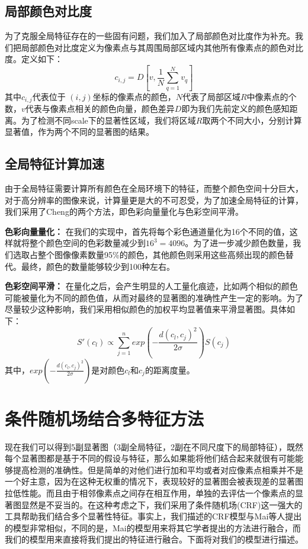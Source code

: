 \subsection{局部颜色对比度}
为了克服全局特征存在的一些固有问题，我们加入了局部颜色对比度作为补充。我们把局部颜色对比度定义为像素点与其周围局部区域内其他所有像素点的颜色对比度。定义如下：
\begin{equation}
  c_{i,j} = D\left [v, \frac{1}{N} \sum_{q=1}^{N}v_q \right ]
\end{equation}
其中$c_{i,j}$代表位于 $(i,j)$坐标的像素点的颜色，$N$代表了局部区域$R$中像素点的个数，$v$代表与像素点相关的颜色向量，颜色差异$D$即为我们先前定义的颜色感知距离。为了检测不同scale下的显著性区域，我们将区域$R$取两个不同大小，分别计算显著值，作为两个不同的显著图的结果。

\subsection{全局特征计算加速}
由于全局特征需要计算所有颜色在全局环境下的特征，而整个颜色空间十分巨大，对于高分辨率的图像来说，计算量更是大的不可忍受，为了加速全局特征的计算，我们采用了Cheng\cite{cheng2011global}的两个方法，即色彩向量量化与色彩空间平滑。

\textbf{色彩向量量化：} 在我们的实现中，首先将每个彩色通道量化为16个不同的值，这样就将整个颜色空间的色彩数量减少到$16^3 = 4096$。为了进一步减少颜色数量，我们选取占整个图像像素数量95\%的颜色，其他颜色则采用这些高频出现的颜色替代。最终，颜色的数量能够较少到100种左右。

\textbf{色彩空间平滑：} 在量化之后，会产生明显的人工量化痕迹，比如两个相似的颜色可能被量化为不同的颜色值，从而对最终的显著图的准确性产生一定的影响。为了尽量较少这种影响，我们采用相似颜色的加权平均显著值来平滑显著图。具体如下：
\begin{equation}
  S'(c_l) \propto \sum_{j=1}^{n} exp(-\frac{d(c_l, c_j)^2}{2\sigma})S(c_j)
\end{equation}
其中，$exp(-\frac{d(c_l, c_j)^2}{2\sigma})$是对颜色$c_l$和$c_j$的距离度量。

\section{条件随机场结合多特征方法}
现在我们可以得到5副显著图（3副全局特征，2副在不同尺度下的局部特征），既然每个显著图都是基于不同的假设与特征，那么如果能将他们结合起来就很有可能能够提高检测的准确性\cite{borji2012salient}。但是简单的对他们进行加和平均或者对应像素点相乘并不是一个好主意，因为在这种无权重的情况下，表现较好的显著图会被表现差的显著图拉低性能\cite{gopalakrishnan2009salient}。而且由于相邻像素点之间存在相互作用，单独的去评估一个像素点的显著图显然是不妥当的。在这种考虑之下，我们采用了条件随机场(CRF)这一强大的工具帮助我们结合多个显著性特征。事实上，我们描述的CRF模型与Mai等人提出的模型\cite{maisaliency}非常相似，不同的是，Mai的模型用来将其它学者提出的方法进行融合，而我们的模型用来直接将我们提出的特征进行融合。下面将对我们的模型进行描述。

